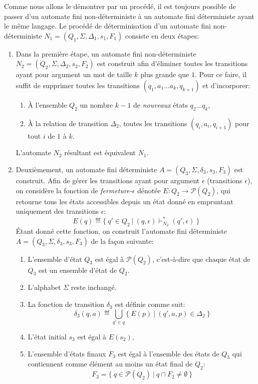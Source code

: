 Comme nous allons le démontrer par un procédé, il est toujours possible de passer d'un automate fini non-déterministe à un automate fini déterministe ayant le même langage.
Le procédé de \og déterminisation \fg{} d'un automate fini non-déterministe $N_1 = (Q_1, \Sigma, \Delta_1, s_1, F_1)$ consiste en deux étapes:
\begin{enumerate}
\item
Dans la première étape, un automate fini non-déterministe $N_2 = (Q_2, \Sigma, \Delta_2, s_2, F_2)$  est construit afin d'éliminer toutes les transitions ayant pour argument un mot de taille $k$ plus grande que $1$. Pour ce faire, il suffit de supprimer toutes les transitions $(q_1, a_1 \dots a_k, q_{k+1})$ et d'incorporer:
\begin{enumerate}
\item À l'ensemble $Q_2$ un nombre $k-1$ de \textit{nouveaux} états $q_2 \dots q_k$,
\item À la relation de transition $\Delta_2$, toutes les transitions $(q_i, a_i, q_{i+1})$ pour tout $i$ de $1$ à $k$.
\end{enumerate}
L'automate $N_2$ résultant est équivalent $N_1$.
\item
Deuxièmement, un automate fini déterministe $A = (Q_3, \Sigma, \delta_3, s_3, F_3)$  est construit.
Afin de gérer les transitions ayant pour argument $\epsilon$ (transitions $\epsilon$), on considère la fonction de \og \textit{fermeture-$\epsilon$} \fg{} dénotée $E : Q_2 \to \mathcal{P}(Q_2)$, qui retourne tous les états accessibles depuis un état donné en empruntant uniquement des transitions $\epsilon$:
\[
E(q) \eqdef \{\ q' \in Q_2\ |\ (q, \epsilon) \vdash_{N_2}^* (q', \epsilon)\ \} 
\]
Étant donné cette fonction, on construit l'automate fini déterministe $A = (Q_3, \Sigma, \delta_3, s_3, F_3)$ de la façon suivante:
\begin{enumerate}
\item L'ensemble d'état $Q_3$ est égal à $\mathcal{P}(Q_2)$, c'est-à-dire que chaque état de $Q_3$ est un ensemble d'état de $Q_2$.
\item L'alphabet $\Sigma$ reste inchangé.
\item La fonction de transition $\delta_3$ est définie comme suit:
\[
\delta_3(q, a) \eqdef \bigcup_{q' \in q} \{\ E(p)\ |\ (q', a, p) \in \Delta_2\ \}
\]
\item L'état initial $s_3$ est égal à $E(s_2)$,
\item L'ensemble d'états finaux $F_3$ est égal à l'ensemble des états de $Q_3$ qui contiennent comme élément au moins un état final de $Q_2$:
\[
F_3 = \{\ q \in \mathcal{P}(Q_2)\ |\ q \cap F_2 \neq \emptyset\ \}
\] 
\end{enumerate}
\end{enumerate}

